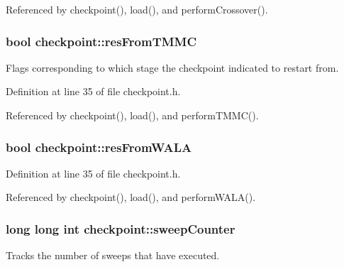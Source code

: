 Referenced by checkpoint(), load(), and perform\-Crossover().

\hypertarget{classcheckpoint_ab8f6081561b8c7871eea6743d4988d8a}{
\subsubsection[{res\-From\-T\-M\-M\-C}]{\setlength{\rightskip}{0pt plus 5cm}bool checkpoint\-::res\-From\-T\-M\-M\-C}}\label{classcheckpoint_ab8f6081561b8c7871eea6743d4988d8a}


Flags corresponding to which stage the checkpoint indicated to restart from. 



Definition at line 35 of file checkpoint.\-h.



Referenced by checkpoint(), load(), and perform\-T\-M\-M\-C().

\hypertarget{classcheckpoint_a46f1c17d03901292f642ccad0a325d9e}{
\subsubsection[{res\-From\-W\-A\-L\-A}]{\setlength{\rightskip}{0pt plus 5cm}bool checkpoint\-::res\-From\-W\-A\-L\-A}}\label{classcheckpoint_a46f1c17d03901292f642ccad0a325d9e}


Definition at line 35 of file checkpoint.\-h.



Referenced by checkpoint(), load(), and perform\-W\-A\-L\-A().

\hypertarget{classcheckpoint_ad011ddbca1ea708321335b1b3ac67e07}{
\subsubsection[{sweep\-Counter}]{\setlength{\rightskip}{0pt plus 5cm}long long int checkpoint\-::sweep\-Counter}}\label{classcheckpoint_ad011ddbca1ea708321335b1b3ac67e07}


Tracks the number of sweeps that have executed. 



